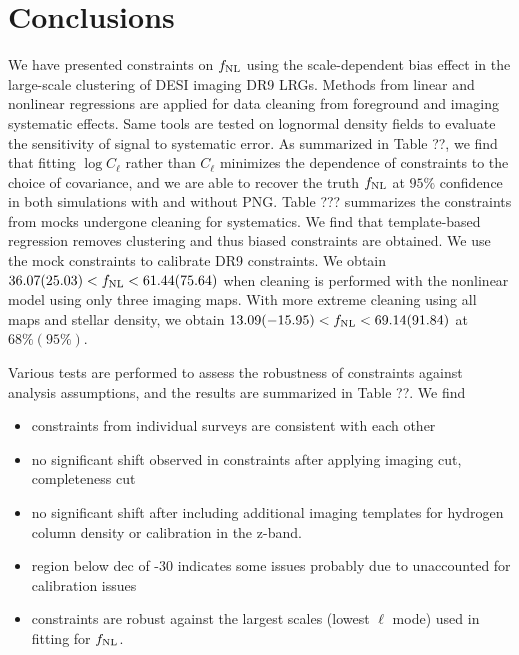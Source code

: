 \section{Conclusions}\label{sec:conclusion}
We have presented constraints on $f_{\rm NL}$ using the scale-dependent bias effect in the large-scale clustering of DESI imaging DR9 LRGs. Methods from linear and nonlinear regressions are applied for data cleaning from foreground and imaging systematic effects. Same tools are tested on lognormal density fields to evaluate the sensitivity of signal to systematic error. As summarized in Table ??, we find that fitting $\log C_{\ell}$ rather than $C_{\ell}$ minimizes the dependence of constraints to the choice of covariance, and we are able to recover the truth $f_{\rm NL}$ at $95\%$ confidence in both simulations with and without PNG. Table ??? summarizes the constraints from mocks undergone cleaning for systematics. We find that template-based regression removes clustering and thus biased constraints are obtained. We use the mock constraints to calibrate DR9 constraints. We obtain $36.07 (25.03) < f_{\rm NL} < 61.44(75.64)$ when cleaning is performed with the nonlinear model using only three imaging maps. With more extreme cleaning using all maps and stellar density, we obtain $13.09(-15.95) < f_{\rm NL} < 69.14(91.84)$ at $68\% (95\%)$.  

Various tests are performed to assess the robustness of constraints against analysis assumptions, and the results are summarized in Table ??. We find
\begin{itemize}
\item constraints from individual surveys are consistent with each other
\item no significant shift observed in constraints after applying imaging cut, completeness cut
\item no significant shift after including additional imaging templates for hydrogen column density or calibration in the z-band.
\item region below dec of -30 indicates some issues probably due to unaccounted for calibration issues
\item constraints are robust against the largest scales (lowest $\ell$ mode) used in fitting for $f_{\rm NL}$. 
\end{itemize}

